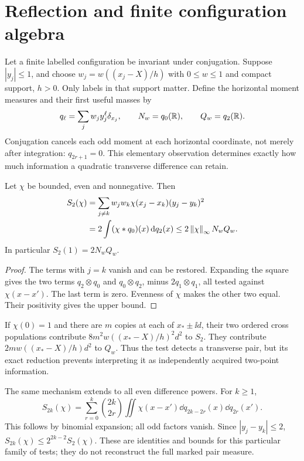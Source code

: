 \section{Reflection and finite configuration algebra}\label{sec:configuration}

Let a finite labelled configuration be invariant under conjugation.
Suppose $|y_j|\le1$, and choose
$w_j=w((x_j-X)/h)$ with $0\le w\le1$ and compact support, $h>0$.
Only labels in that support matter. Define the horizontal moment
measures and their first useful masses by
\begin{equation}\label{eq:qmoments}
 q_\ell=\sum_jw_jy_j^\ell\delta_{x_j},\qquad
 N_w=q_0(\mathbb R),\qquad Q_w=q_2(\mathbb R).
\end{equation}
Conjugation cancels each odd moment at each horizontal coordinate,
not merely after integration:
$q_{2r+1}=0$. This elementary observation determines exactly how much
information a quadratic transverse difference can retain.

\begin{proposition}\label{prop:quadratic}
Let $\chi$ be bounded, even and nonnegative. Then
\begin{align}
 S_2(\chi)&=\sum_{j\ne k}
    w_jw_k\chi(x_j-x_k)(y_j-y_k)^2 \notag\\
 &=2\int(\chi*q_0)(x)\,\mathrm d q_2(x)
 \le 2\left\|\chi\right\|_\infty N_wQ_w .\label{eq:quadratic-reduction}
\end{align}
In particular $S_2(1)=2N_wQ_w$.
\end{proposition}
\begin{proof}
The terms with $j=k$ vanish and can be restored. Expanding the square
gives the two terms $q_2\otimes q_0$ and $q_0\otimes q_2$,
minus $2q_1\otimes q_1$, all tested against $\chi(x-x')$.
The last term is zero. Evenness of $\chi$ makes the other two equal.
Their positivity gives the upper bound.
\end{proof}

If $\chi(0)=1$ and there are $m$ copies at each of $x_*\pm\ii d$,
their two ordered cross populations contribute
$8m^2w((x_*-X)/h)^2d^2$ to $S_2$.
They contribute $2mw((x_*-X)/h)d^2$ to $Q_w$.
Thus the test detects a transverse pair, but its exact reduction
prevents interpreting it as independently acquired two-point
information.

The same mechanism extends to all even difference powers. For $k\ge1$,
\begin{equation}\label{eq:higher-moments}
 S_{2k}(\chi)=
 \sum_{r=0}^k \binom{2k}{2r}
       \iint\chi(x-x')\dd q_{2k-2r}(x)\dd q_{2r}(x').
\end{equation}
This follows by binomial expansion; all odd factors vanish.
Since $|y_j-y_k|\le2$,
$S_{2k}(\chi)\le2^{2k-2}S_2(\chi)$.
These are identities and bounds for this particular family of tests;
they do not reconstruct the full marked pair measure.

